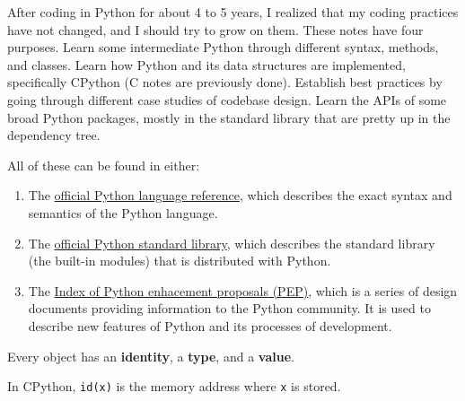 After coding in Python for about 4 to 5 years, I realized that my coding practices have not changed, and I should try to grow on them. These notes have four purposes. Learn some intermediate Python through different syntax, methods, and classes. Learn how Python and its data structures are implemented, specifically CPython (C notes are previously done). Establish best practices by going through different case studies of codebase design. Learn the APIs of some broad Python packages, mostly in the standard library that are pretty up in the dependency tree. 

All of these can be found in either: 
\begin{enumerate}
  \item The \href{https://docs.python.org/3/reference}{official Python language reference}, which describes the exact syntax and semantics of the Python language. 
  \item The \href{https://docs.python.org/3/library/index.html}{official Python standard library}, which describes the standard library (the built-in modules) that is distributed with Python. 
  \item The \href{https://peps.python.org/}{Index of Python enhacement proposals (PEP)}, which is a series of design documents providing information to the Python community. It is used to describe new features of Python and its processes of development. 
\end{enumerate}

\begin{definition}[Object]
  Every object has an \textbf{identity}, a \textbf{type}, and a \textbf{value}. 
\end{definition}

\begin{theorem}[]
  In CPython, \texttt{id(x)} is the memory address where \texttt{x} is stored. 
\end{theorem}
